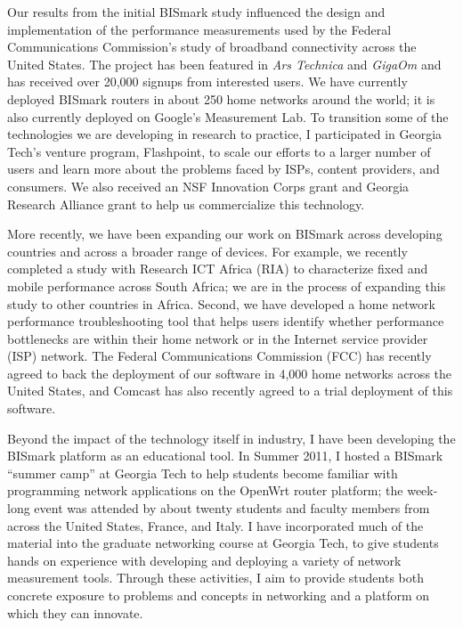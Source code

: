 Our results from the initial BISmark study influenced the design and
implementation of the performance measurements used by the Federal
Communications Commission's study of broadband connectivity across the
United States.  The project has been featured in {\em Ars Technica} and
{\em GigaOm} and has received over 20,000 signups from interested users.
We have currently deployed BISmark routers in about 250 home networks
around the world; it is also currently deployed on Google's Measurement
Lab.  To transition some of the technologies we are developing in
research to practice, I participated in Georgia Tech's venture program,
Flashpoint, to scale our efforts to a larger number of users and learn
more about the problems faced by ISPs, content providers, and consumers.
We also received an NSF Innovation Corps grant and Georgia Research
Alliance grant to help us commercialize this technology.

More recently, we have been expanding our work on BISmark across
developing countries and across a broader range of devices.  For
example, we recently completed a study with Research ICT Africa (RIA) to
characterize fixed and mobile performance across South Africa; we are in
the process of expanding this study to other countries in Africa.
Second, we have developed a home network performance troubleshooting
tool that helps users identify whether performance bottlenecks are
within their home network or in the Internet service provider (ISP)
network.  The Federal Communications Commission (FCC) has recently
agreed to back the deployment of our software in 4,000 home networks
across the United States, and Comcast has also recently agreed to a
trial deployment of this software. 

Beyond the impact of the technology itself in industry, I have been
developing the BISmark platform as an educational tool.  In Summer 2011,
I hosted a BISmark ``summer camp'' at Georgia Tech to help students
become familiar with programming network applications on the OpenWrt
router platform; the week-long event was attended by about twenty
students and faculty members from across the United States, France, and
Italy.  I have incorporated much of the material into the graduate
networking course at Georgia Tech, to give students hands on experience
with developing and deploying a variety of network measurement tools.
Through these activities, I aim to provide students both concrete
exposure to problems and concepts in networking and a platform on which
they can innovate.

